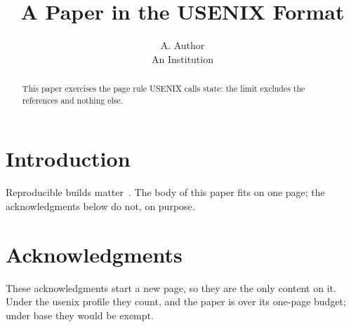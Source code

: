 \documentclass[letterpaper,twocolumn,10pt]{article}
\title{A Paper in the USENIX Format}
\author{A. Author \\ An Institution}
\date{}
\begin{document}
\maketitle

\begin{abstract}
This paper exercises the page rule USENIX calls state: the limit excludes
the references and nothing else.
\end{abstract}

\section{Introduction}

Reproducible builds matter~\cite{reproducible}. The body of this paper fits
on one page; the acknowledgments below do not, on purpose.

\clearpage
\section*{Acknowledgments}

These acknowledgments start a new page, so they are the only content on it.
Under the usenix profile they count, and the paper is over its one-page
budget; under base they would be exempt.



\end{document}
